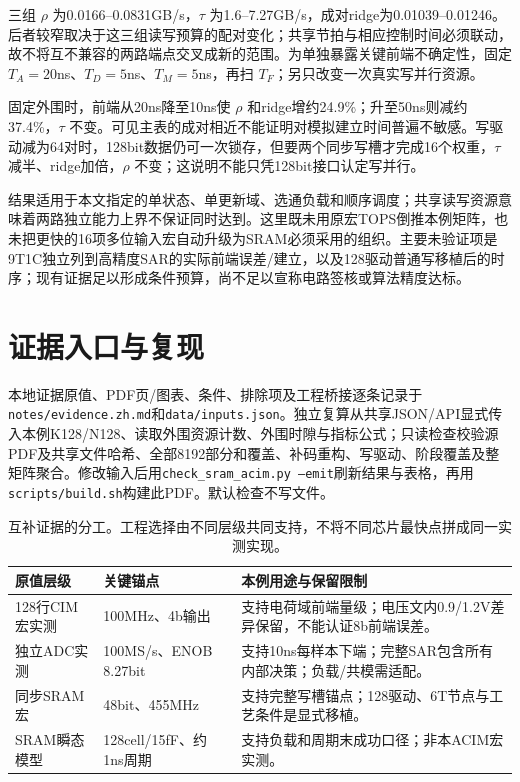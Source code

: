 三组 $\rho$ 为0.0166--0.0831GB/s，$\tau$ 为1.6--7.27GB/s，成对ridge为0.01039--0.01246。后者较窄取决于这三组读写预算的配对变化；共享节拍与相应控制时间必须联动，故不将互不兼容的两路端点交叉成新的范围。为单独暴露关键前端不确定性，固定 $T_A=20$ns、$T_D=5$ns、$T_M=5$ns，再扫 $T_F$；另只改变一次真实写并行资源。



固定外围时，前端从20ns降至10ns使 $\rho$ 和ridge增约24.9\%；升至50ns则减约37.4\%，$\tau$ 不变。可见主表的成对相近不能证明对模拟建立时间普遍不敏感。写驱动减为64对时，128bit数据仍可一次锁存，但要两个同步写槽才完成16个权重，$\tau$ 减半、ridge加倍，$\rho$ 不变；这说明不能只凭128bit接口认定写并行。

结果适用于本文指定的单状态、单更新域、选通负载和顺序调度；共享读写资源意味着两路独立能力上界不保证同时达到。这里既未用原宏TOPS倒推本例矩阵，也未把更快的16项多位输入宏自动升级为SRAM必须采用的组织。主要未验证项是9T1C独立列到高精度SAR的实际前端误差/建立，以及128驱动普通写移植后的时序；现有证据足以形成条件预算，尚不足以宣称电路签核或算法精度达标。

\clearpage
\section{证据入口与复现}

本地证据原值、PDF页/图表、条件、排除项及工程桥接逐条记录于\texttt{notes/evidence.zh.md}和\texttt{data/inputs.json}。独立复算从共享JSON/API显式传入本例K128/N128、读取外围资源计数、外围时隙与指标公式；只读检查校验源PDF及共享文件哈希、全部8192部分和覆盖、补码重构、写驱动、阶段覆盖及整矩阵聚合。修改输入后用\texttt{check\_sram\_acim.py --emit}刷新结果与表格，再用\texttt{scripts/build.sh}构建此PDF。默认检查不写文件。

\begin{table}[htbp]\centering\small
\begin{tabularx}{\textwidth}{@{}p{27mm}p{38mm}X@{}}\toprule
原值层级 & 关键锚点 & 本例用途与保留限制\\\midrule
128行CIM宏实测 & 100MHz、4b输出 & 支持电荷域前端量级；电压文内0.9/1.2V差异保留，不能认证8b前端误差。\\
独立ADC实测 & 100MS/s、ENOB 8.27bit & 支持10ns每样本下端；完整SAR包含所有内部决策；负载/共模需适配。\\
同步SRAM宏 & 48bit、455MHz & 支持完整写槽锚点；128驱动、6T节点与工艺条件是显式移植。\\
SRAM瞬态模型 & 128cell/15fF、约1ns周期 & 支持负载和周期末成功口径；非本ACIM宏实测。\\\bottomrule
\end{tabularx}
\caption{互补证据的分工。工程选择由不同层级共同支持，不将不同芯片最快点拼成同一实测实现。}
\end{table}

